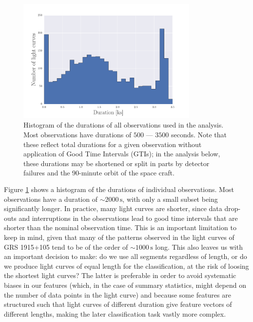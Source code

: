 \documentclass[fleqn,usenatbib]{mnras}
\begin{document}
\begin{figure}
\begin{center}
\includegraphics[width=9cm]{grs1915_durations.pdf}
\caption{Histogram of the durations of all observations used in the analysis. Most observations have durations of $500$ --- $3500$ seconds. Note that these reflect total durations for a given observation without application of Good Time Intervals (GTIs); in the analysis below, these durations may be shortened or split in parts by detector failures and the $90$-minute orbit of the space craft.}
\label{fig:obsdurations}
\end{center}
\end{figure}

Figure \ref{fig:obsdurations} shows a histogram of the durations of individual observations. Most observations have a duration of $\sim\!2000 \,\mathrm{s}$, with only a small subset being significantly longer.
In practice, many light curves are shorter, since data drop-outs and interruptions in the observations lead to good time intervals that are shorter than the nominal observation time. This is an important limitation to keep in mind, given that many of the patterns observed in the light curves of GRS 1915+105 tend to be of the order of $\sim\! 1000 \,\mathrm{s}$ long.  This also leaves us with an important decision to make: do we use all segments regardless of length, or do we produce light curves of equal length for the classification, at the risk of loosing the shortest light curves? The latter is preferable in order to avoid systematic biases in our features (which, in the case of summary statistics, might depend on the number of data points in the light curve) and because some features are structured such that light curves of different duration give feature vectors of different lengths, making the later classification task vastly more complex. 
\end{document}
